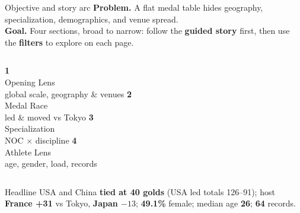 \documentclass[aspectratio=169,11pt]{beamer}
\newcommand{\teallead}[1]{{\color{teal}\textbf{#1}}}
\begin{document}
\begin{frame}{Objective and story arc}
  \small
  \textbf{Problem.} A flat medal table hides geography, specialization,
  demographics, and venue spread.\\[4pt]
  \textbf{Goal.} Four sections, broad to narrow: follow the \teallead{guided
  story} first, then use the \teallead{filters} to explore on each page.
  \vspace{6pt}
  \begin{columns}[T]
    \centering
      {\color{gold}\textbf{1}}\\ \footnotesize Opening Lens\\ \scriptsize\color{slate} global scale, geography \& venues
    \centering
      {\color{gold}\textbf{2}}\\ \footnotesize Medal Race\\ \scriptsize\color{slate} led \& moved vs Tokyo
    \centering
      {\color{gold}\textbf{3}}\\ \footnotesize Specialization\\ \scriptsize\color{slate} NOC $\times$ discipline
    \centering
      {\color{gold}\textbf{4}}\\ \footnotesize Athlete Lens\\ \scriptsize\color{slate} age, gender, load, records
  \end{columns}
  \vspace{8pt}
  \begin{block}{Headline}
    \footnotesize USA and China \textbf{tied at 40 golds} (USA led totals 126--91);
    host \textbf{France +31} vs Tokyo, \textbf{Japan $-13$};
    \textbf{49.1\%} female; median age \textbf{26}; \textbf{64} records.
  \end{block}
\end{frame}
\end{document}
